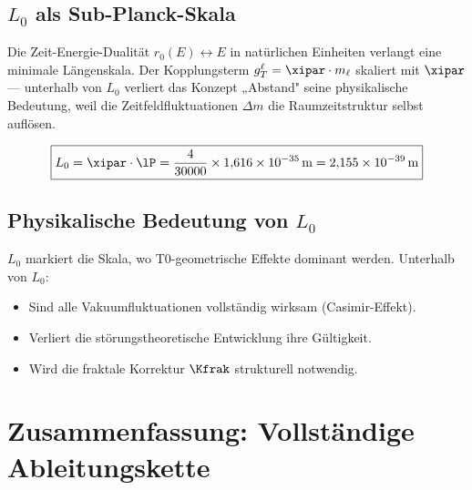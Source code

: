 \subsection{\texorpdfstring{$L_0$}{L0} als Sub-Planck-Skala}

Die Zeit-Energie-Dualität $r_0(E) \leftrightarrow E$ in natürlichen Einheiten verlangt eine minimale Längenskala. Der Kopplungsterm $g_T^\ell = \xipar \cdot m_\ell$ skaliert mit $\xipar$ — unterhalb von $L_0$ verliert das Konzept „Abstand" seine physikalische Bedeutung, weil die Zeitfeldfluktuationen $\Delta m$ die Raumzeitstruktur selbst auflösen.

\begin{keyresult}
\begin{equation}
	\boxed{L_0 = \xipar \cdot \lP = \frac{4}{30000} \times 1{,}616 \times 10^{-35}\,\text{m} = 2{,}155 \times 10^{-39}\,\text{m}}
	\label{eq:L0}
\end{equation}
\end{keyresult}

\subsection{Physikalische Bedeutung von \texorpdfstring{$L_0$}{L0}}

$L_0$ markiert die Skala, wo T0-geometrische Effekte dominant werden. Unterhalb von $L_0$:
\begin{itemize}
	\item Sind alle Vakuumfluktuationen vollständig wirksam (Casimir-Effekt).
	\item Verliert die störungstheoretische Entwicklung ihre Gültigkeit.
	\item Wird die fraktale Korrektur $\Kfrak$ strukturell notwendig.
\end{itemize}

\section{Zusammenfassung: Vollständige Ableitungskette}


